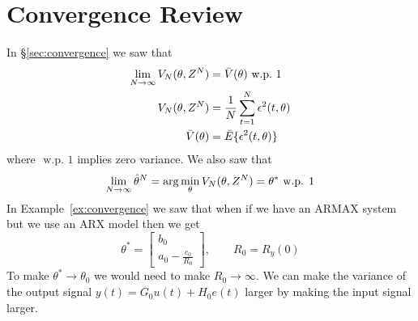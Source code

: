 \mainmatter%
\setcounter{page}{1}

\lectureseries[\course]{\course}

\date{November 12, 2009}

\setaddress%

\setcounter{lecture}{13}
\setcounter{chapter}{13}


\section{Convergence Review}
In \S\ref{sec:convergence} we saw that
\begin{align*}
\lim_{N\to\infty}V_N(\theta,Z^N) &= \bar{V}(\theta) \text{~w.p.~} 1 \\
V_N(\theta,Z^N) &= \frac{1}{N}\sum_{t=1}^N\epsilon^2(t,\theta) \\
\bar{V}(\theta) &= \bar{E}\{\epsilon^2(t,\theta)\}
\end{align*}
where $\text{ w.p. } 1$ implies zero variance.
We also saw that
$$\lim_{N\to\infty}\hat{\theta}^N = \arg\min_\theta V_N(\theta,Z^N) = \theta^\ast \text{ w.p. } 1$$
In Example~\ref{ex:convergence} we saw that when if we have an ARMAX system but we use an ARX model then we get
$$\theta^\ast = \left[\begin{array}{c} b_0 \\ a_0-\frac{c_0}{R_0} \end{array}\right], \qquad R_0=R_y (0)$$
To make $\theta^\ast\to\theta_0$ we would need to make $R_0\to\infty$.
We can make the variance of the output signal $y (t)=G_0u (t)+H_0e (t)$ larger by making the input signal larger.

